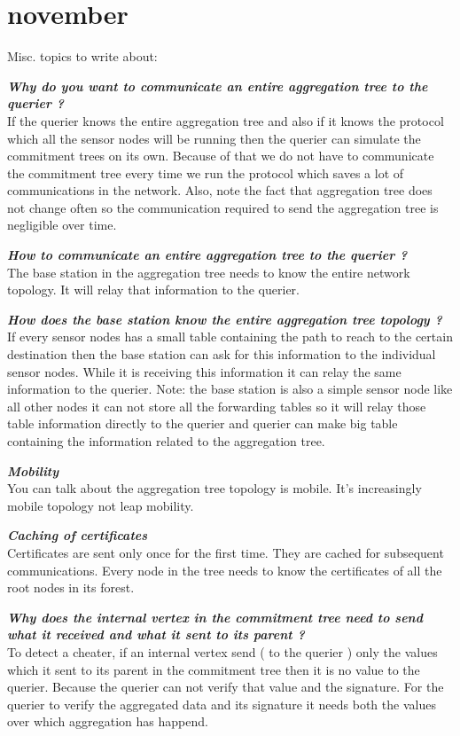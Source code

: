 \chapter{november}

Misc. topics to write about:

\textbf{\textit{Why do you want to communicate an entire aggregation tree to the querier ?}}\\
	If the querier knows the entire aggregation tree and also if it knows the protocol which all the sensor nodes will be running then the querier can simulate the commitment trees on its own. Because of that we do not have to communicate the commitment tree every time we run the protocol which saves a lot of communications in the network. Also, note the fact that aggregation tree does not change often so the communication required to send the aggregation tree is negligible over time.

\textbf{\textit{How to communicate an entire aggregation tree to the querier ?}}\\
	The base station in the aggregation tree needs to know the entire network topology.
	It will relay that information to the querier.

\textbf{\textit{How does the base station know the entire aggregation tree topology ?}}\\
	If every sensor nodes has a small table containing the path to reach to the certain destination then the base station can ask for this information to the individual sensor nodes. While it is receiving this information it can relay the same information to the querier. Note: the base station is also a simple sensor node like all other nodes it can not store all the forwarding tables so it will relay those table information directly to the querier and querier can make big table containing the information related to the aggregation tree.

\textbf{\textit{Mobility}}\\
	You can talk about the aggregation tree topology is mobile. It's increasingly mobile topology not leap mobility.

\textbf{\textit{Caching of certificates}}\\
		Certificates are sent only once for the first time. They are cached for subsequent communications. Every node in the tree needs to know the certificates of all the root nodes in its forest.

\textbf{\textit{Why does the internal vertex in the commitment tree need to send what it received and what it sent to its parent ?}}\\
	To detect a cheater, if an internal vertex send ( to the querier ) only the values which it sent to its parent in the commitment tree then it is no value to the querier. Because the querier can not verify that value and the signature. For the querier to verify the aggregated data and its signature it needs both the values over which aggregation has happend. 

